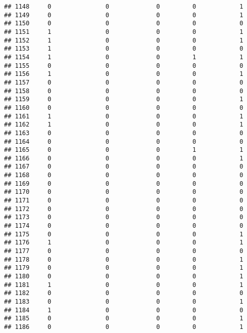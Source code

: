 \documentclass[]{article}
\begin{document}
\begin{verbatim}
## 1148     0               0             0         0            1
## 1149     0               0             0         0            1
## 1150     0               0             0         0            0
## 1151     1               0             0         0            1
## 1152     1               0             0         0            1
## 1153     1               0             0         0            0
## 1154     1               0             0         1            1
## 1155     0               0             0         0            0
## 1156     1               0             0         0            1
## 1157     0               0             0         0            0
## 1158     0               0             0         0            0
## 1159     0               0             0         0            1
## 1160     0               0             0         0            0
## 1161     1               0             0         0            1
## 1162     1               0             0         0            1
## 1163     0               0             0         0            0
## 1164     0               0             0         0            0
## 1165     0               0             0         1            1
## 1166     0               0             0         0            1
## 1167     0               0             0         0            0
## 1168     0               0             0         0            0
## 1169     0               0             0         0            0
## 1170     0               0             0         0            0
## 1171     0               0             0         0            0
## 1172     0               0             0         0            0
## 1173     0               0             0         0            0
## 1174     0               0             0         0            0
## 1175     0               0             0         0            1
## 1176     1               0             0         0            1
## 1177     0               0             0         0            0
## 1178     0               0             0         0            1
## 1179     0               0             0         0            1
## 1180     0               0             0         0            1
## 1181     1               0             0         0            1
## 1182     0               0             0         0            0
## 1183     0               0             0         0            1
## 1184     1               0             0         0            0
## 1185     0               0             0         0            1
## 1186     0               0             0         0            1

\end{verbatim}
\end{document}
